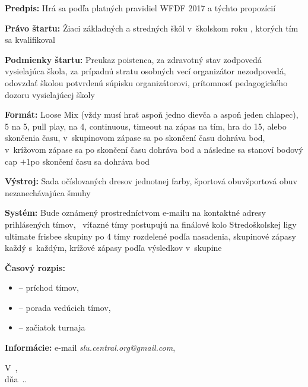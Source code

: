 {\begin{enumerate}[label={\Alph*.},font={\bfseries}]
		\vspace{5pt}
		\textbf{Predpis:} Hrá sa podľa platných pravidiel WFDF 2017 a týchto propozícií\par
		\textbf{Právo štartu:} Žiaci základných a stredných škôl v~školskom roku \the\rok\if\the{}, ktorých tím sa kvalifikoval\fi\par
		\textbf{Podmienky štartu:} Preukaz poistenca, za zdravotný stav zodpovedá vysielajúca škola, za prípadnú stratu osobných vecí organizátor nezodpovedá, odovzdať školou potvrdenú súpisku organizátorovi, prítomnosť pedagogického dozoru vysielajúcej školy\par
		\textbf{Formát:} Loose Mix (vždy musí hrať aspoň jedno dievča a aspoň jeden chlapec), 
		\if\the{}%
			5 na 5, pull play, 
		 na 4, continuous, 
		 timeout na zápas na tím, hra do 15, alebo skončenia času, \if\the{} v~skupinovom zápase sa po skončení času dohráva bod, v~krížovom zápase sa po skončení času dohráva bod a následne sa stanoví bodový cap $+1$\else po skončení času sa dohráva bod\fi\par
		\textbf{Výstroj:} Sada očíslovaných dresov jednotnej farby, \if\the{} športová obuv\else športová obuv nezanechávajúca šmuhy\par
		\textbf{Systém:} \if\the{} Bude oznámený prostredníctvom e-mailu na kontaktné adresy prihlásených tímov, \the\postupujuci\ víťazné tímy postupujú na finálové kolo Stredoškolskej ligy ultimate frisbee skupiny po 4 tímy rozdelené podľa nasadenia, skupinové zápasy každý s~každým, krížové zápasy podľa výsledkov v~skupine\fi\par
		\textbf{Časový rozpis:} 
		\begin{itemize}
		\setlength{\itemindent}{15pt}
			\item \textbf{\the\casPrichodu} -- príchod tímov, 
			\item \textbf{\the\casPorady} -- porada vedúcich tímov, 
			\item \textbf{\the\zaciatok} -- začiatok turnaja
		\end{itemize}\par
		\textbf{Informácie:} e-mail \textit{slu.central.org@gmail.com}, \the\kontakt\par
	\end{enumerate}

	\vfill
	\begin{minipage}{.2\textwidth}
		\begin{center}
			V~\the\vMeste, \\
			dňa~\the\day .\the\month .\the\year
		\end{center}
	\end{minipage}
	\hfill
	\begin{minipage}{.25\textwidth}
		\begin{center}
			\the\riaditel
		\end{center}
	\end{minipage}
}

